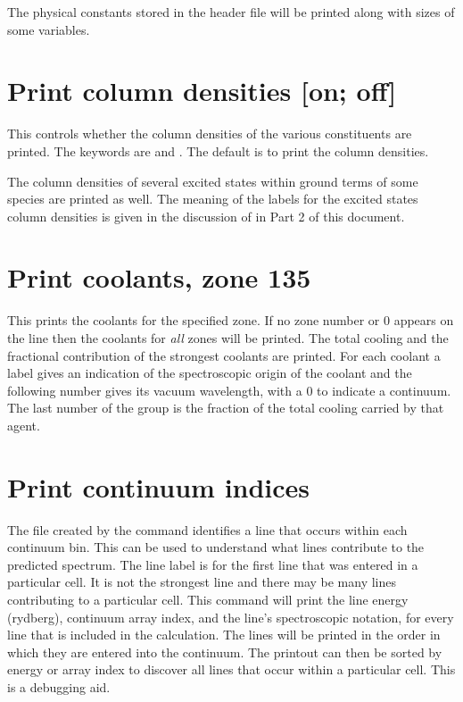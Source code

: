The physical constants stored in the header file  will be
printed along with sizes of some variables.

\section{Print column densities [on; off]}

This controls whether the column densities of the various constituents
are printed.  The keywords are  and .  The default is to print the
column densities.

The column densities of several excited states within ground terms of
some species are printed as well.  The meaning of the labels for the excited
states column densities is given in the discussion of  in Part 2 of
this document.

\section{Print coolants, zone 135}

This prints the coolants for the specified zone.
If no zone number or
0 appears on the line then the coolants for \emph{all} zones will be printed.
The total cooling and the fractional contribution of the strongest coolants
are printed.  For each coolant a label gives an indication of the
spectroscopic origin of the coolant and the following number gives its
vacuum wavelength, with a 0 to indicate a continuum.  The last number of the group
is the fraction of the total cooling carried by that agent.

\section{Print continuum indices}

The file created by the  command
identifies a line that occurs within each continuum bin.
This can be used
to understand what lines contribute to the predicted spectrum.
The line
label is for the first line that was entered in a particular cell.
It is
not the strongest line and there may be many lines contributing to a
particular cell.
This command will print the line energy (rydberg),
continuum array index, and the line's spectroscopic notation, for every
line that is included in the calculation.
The lines will be printed in
the order in which they are entered into the continuum.
The printout can
then be sorted by energy or array index to discover all lines that occur
within a particular cell.
This is a debugging aid.

